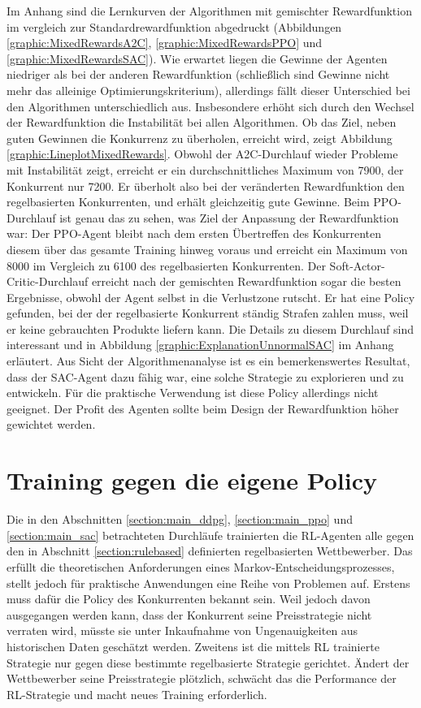 Im Anhang sind die Lernkurven der Algorithmen mit gemischter Rewardfunktion im vergleich zur Standardrewardfunktion abgedruckt (Abbildungen \ref{graphic:MixedRewardsA2C}, \ref{graphic:MixedRewardsPPO} und \ref{graphic:MixedRewardsSAC}).
Wie erwartet liegen die Gewinne der Agenten niedriger als bei der anderen Rewardfunktion (schließlich sind Gewinne nicht mehr das alleinige Optimierungskriterium), allerdings fällt dieser Unterschied bei den Algorithmen unterschiedlich aus.
Insbesondere erhöht sich durch den Wechsel der Rewardfunktion die Instabilität bei allen Algorithmen.
Ob das Ziel, neben guten Gewinnen die Konkurrenz zu überholen, erreicht wird, zeigt Abbildung \ref{graphic:LineplotMixedRewards}.
Obwohl der A2C-Durchlauf wieder Probleme mit Instabilität zeigt, erreicht er ein durchschnittliches Maximum von 7900, der Konkurrent nur 7200.
Er überholt also bei der veränderten Rewardfunktion den regelbasierten Konkurrenten, und erhält gleichzeitig gute Gewinne.
Beim PPO-Durchlauf ist genau das zu sehen, was Ziel der Anpassung der Rewardfunktion war:
Der PPO-Agent bleibt nach dem ersten Übertreffen des Konkurrenten diesem über das gesamte Training hinweg voraus und erreicht ein Maximum von 8000 im Vergleich zu 6100 des regelbasierten Konkurrenten.
Der Soft-Actor-Critic-Durchlauf erreicht nach der gemischten Rewardfunktion sogar die besten Ergebnisse, obwohl der Agent selbst in die Verlustzone rutscht.
Er hat eine Policy gefunden, bei der der regelbasierte Konkurrent ständig Strafen zahlen muss, weil er keine gebrauchten Produkte liefern kann.
Die Details zu diesem Durchlauf sind interessant und in Abbildung \ref{graphic:ExplanationUnnormalSAC} im Anhang erläutert.
Aus Sicht der Algorithmenanalyse ist es ein bemerkenswertes Resultat, dass der SAC-Agent dazu fähig war, eine solche Strategie zu explorieren und zu entwickeln.
Für die praktische Verwendung ist diese Policy allerdings nicht geeignet.
Der Profit des Agenten sollte beim Design der Rewardfunktion höher gewichtet werden.

\section{Training gegen die eigene Policy}
Die in den Abschnitten \ref{section:main_ddpg}, \ref{section:main_ppo} und \ref{section:main_sac} betrachteten Durchläufe trainierten die RL-Agenten alle gegen den in Abschnitt \ref{section:rulebased} definierten regelbasierten Wettbewerber.
Das erfüllt die theoretischen Anforderungen eines Markov-Entscheidungsprozesses, stellt jedoch für praktische Anwendungen eine Reihe von Problemen auf.
Erstens muss dafür die Policy des Konkurrenten bekannt sein.
Weil jedoch davon ausgegangen werden kann, dass der Konkurrent seine Preisstrategie nicht verraten wird, müsste sie unter Inkaufnahme von Ungenauigkeiten aus historischen Daten geschätzt werden.
Zweitens ist die mittels RL trainierte Strategie nur gegen diese bestimmte regelbasierte Strategie gerichtet.
Ändert der Wettbewerber seine Preisstrategie plötzlich, schwächt das die Performance der RL-Strategie und macht neues Training erforderlich.


